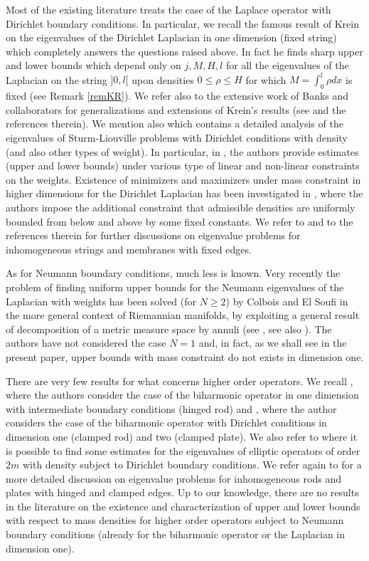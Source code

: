 \documentclass[11pt,a4paper]{amsart}
\numberwithin{equation}{section}
\begin{document}
Most of the existing literature treats the case of the Laplace operator with Dirichlet boundary conditions. In particular, we recall the famous result of Krein \cite{krein} on the eigenvalues of the Dirichlet Laplacian in one dimension (fixed string) which completely answers the questions raised above. In fact he finds sharp upper and lower bounds which depend only on $j,M,H,l$ for all the eigenvalues of the Laplacian on the string $]0,l[$ upon densities $0\leq\rho\leq H$ for which $M=\int_0^l\rho dx$ is fixed (see Remark \ref{remKR}). We refer also to the extensive work of Banks and collaborators for generalizations and extensions of Krein's results (see \cite{banks5,banks4,banks3,banks2,banks1} and the references therein). We mention also \cite[\S\,5]{egorov} which contains a detailed analysis of the eigenvalues of Sturm-Liouville problems with Dirichlet conditions with density (and also other types of weight). In particular, in \cite[\S\,5]{egorov}, the authors provide estimates (upper and lower bounds) under various type of linear and non-linear constraints on the weights. Existence of  minimizers and maximizers under mass constraint in higher dimensions for the Dirichlet Laplacian has been investigated in \cite{chanillo,cox0,cox1,cox2,friedland1}, where the authors impose the additional constraint that admissible densities are uniformly bounded from below and above by some fixed constants. We refer to \cite[\S\,9]{Henrot} and to the references therein for further discussions on eigenvalue problems for inhomogeneous strings and membranes with fixed edges.

As for Neumann boundary conditions, much less is known. Very recently the problem of finding uniform upper bounds for the Neumann eigenvalues of the Laplacian with weights has been solved (for $N\geq 2$) by Colbois and El Soufi \cite{colbois_elsoufi} in the more general context of Riemannian manifolds, by exploiting a general result of decomposition of a metric measure space by annuli (see \cite{gny}, see also \cite{korevaar}). The authors have not considered the case $N=1$ and, in fact, as we shall see in the present paper, upper bounds with mass constraint do not exists in dimension one. 

There are very few results for what concerns higher order operators. We recall \cite{banksrods,schwarzrods}, where the authors consider the case of the biharmonic operator in one dimension with intermediate boundary conditions (hinged rod) and \cite{beesackrods}, where the author considers the case of the biharmonic operator with Dirichlet conditions in dimension one (clamped rod) and two (clamped plate). We also refer to \cite[\S\,7.9]{egorov} where it is possible to find some estimates for the eigenvalues of elliptic operators of order $2m$ with density subject to Dirichlet boundary conditions. We refer again to \cite[\S\,11]{Henrot} for a more detailed discussion on eigenvalue problems for inhomogeneous rods and plates with hinged and clamped edges. Up to our knowledge, there are no results in the literature on the existence and characterization of upper and lower bounds with respect to mass densities for higher order operators subject to Neumann boundary conditions (already for the biharmonic operator or the Laplacian in dimension one).
\end{document}
